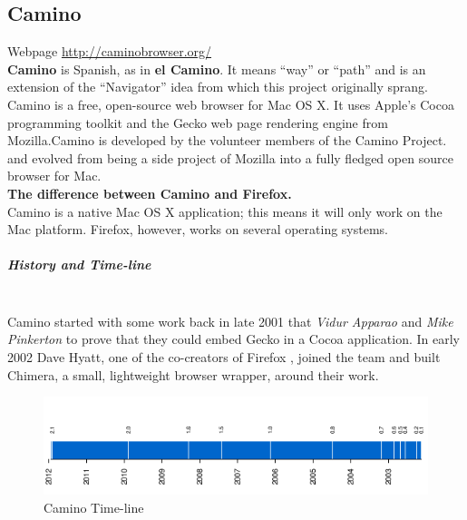 \documentclass[11pt]{article} %
\begin{document}
\subsection{Camino}
Webpage \url{http://caminobrowser.org/}\\
 \textbf{Camino} is Spanish, as in \textbf{el Camino}. It means “way” or “path” and is an extension of the “Navigator” idea from which this project originally sprang.\\
 Camino is a free, open-source web browser for Mac OS X. It uses Apple’s Cocoa programming toolkit and the Gecko web page rendering engine from Mozilla.Camino is developed by the volunteer members of the Camino Project.
and evolved from being a side project of Mozilla into a fully fledged open source browser for Mac.\\
\textbf{ The difference between Camino and Firefox.} \\
 Camino is a native Mac OS X application; this means it will only work on the Mac platform. Firefox, however,  works on several operating systems.
  \subparagraph{History and Time-line} \mbox{} \\
Camino started with some work back in late 2001 that \textit{Vidur Apparao} and \textit{Mike Pinkerton}  to prove that they could embed Gecko in a Cocoa application. 
 In early 2002 Dave Hyatt, one of the co-creators of Firefox , joined the team and built Chimera, a small, lightweight browser wrapper, around their work.
       \begin{figure}
   \centering
        \includegraphics[scale=0.6]{./Caminotimeline.png}
     \caption{Camino Time-line}
      \end{figure}
\end{document}
